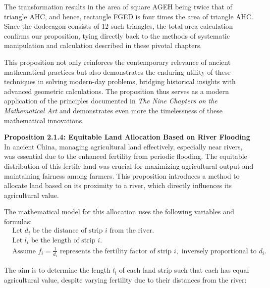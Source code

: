 \documentclass[10pt]{article}
\begin{document}
\vspace{7pt}

The transformation results in the area of square AGEH being twice that of triangle AHC, and hence, rectangle FGED is four times the area of triangle AHC. Since the dodecagon consists of 12 such triangles, the total area calculation confirms our proposition, tying directly back to the methods of systematic manipulation and calculation described in these pivotal chapters.

\vspace{7pt}

This proposition not only reinforces the contemporary relevance of ancient mathematical practices but also demonstrates the enduring utility of these techniques in solving modern-day problems, bridging historical insights with advanced geometric calculations. The proposition thus serves as a modern application of the principles documented in \textit{The Nine Chapters on the Mathematical Art} and demonstrates even more the timelessness of these mathematical innovations.

\vspace{15pt}

\textbf{Proposition 2.1.4: Equitable Land Allocation Based on River Flooding} In ancient China, managing agricultural land effectively, especially near rivers, was essential due to the enhanced fertility from periodic flooding. The equitable distribution of this fertile land was crucial for maximizing agricultural output and maintaining fairness among farmers. This proposition introduces a method to allocate land based on its proximity to a river, which directly influences its agricultural value.

\vspace{7pt}

The mathematical model for this allocation uses the following variables and formulas:
\begin{align}
    & \text{Let } d_i \text{ be the distance of strip } i \text{ from the river.} & \nonumber \\
    & \text{Let } l_i \text{ be the length of strip } i. & \nonumber \\
    & \text{Assume } f_i = \frac{1}{d_i} \text{ represents the fertility factor of strip } i, \text{ inversely proportional to } d_i. & \nonumber
\end{align}

The aim is to determine the length \(l_i\) of each land strip such that each has equal agricultural value, despite varying fertility due to their distances from the river:
\end{document}
